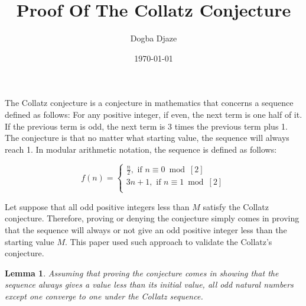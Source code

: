 \documentclass[14pt,a4paper]{article}
\title{Proof Of The Collatz Conjecture}
\author{Dogba Djaze}
\affil{\small{Aerospace Engineering Department, \\ University of Bristol}}
\date{\today}
\newtheorem{lemma}[theorem]{Lemma}
\theoremstyle{plain}
\begin{document}
\maketitle

	The Collatz conjecture is a conjecture in mathematics that concerns a sequence defined as follows: For any positive integer, if even, the next term is one half of it. If the previous term is odd, the next term is 3 times the previous term plus 1. The conjecture is that no matter what starting value, the sequence will always reach 1. In modular arithmetic notation, the sequence is defined as follows:
	
	\[
	f(n) = 
	\begin{cases}
	\frac{n}{2} , \text{ if } n \equiv 0 \bmod[2]\\
	3n+1, \text{ if } n \equiv 1 \bmod[2]\\
	\end{cases}
	\]
	
    Let suppose that all odd positive integers less than $M$ satisfy the Collatz conjecture. Therefore, proving or denying the conjecture simply comes in proving that the sequence will always or not give an odd positive integer less than the starting value $M$. This paper used such approach to validate the Collatz's conjecture.\\
	
\begin{lemma}
    Assuming that proving the conjecture comes in showing that the sequence always gives a value less than its initial value, all odd natural numbers except one converge to one under the Collatz sequence.
\end{lemma}
	
\end{document}
